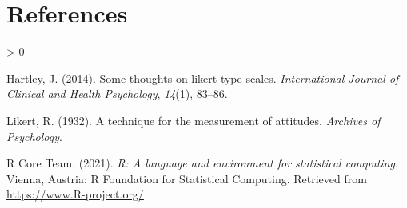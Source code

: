 \documentclass[
  english,
  man,floatsintext]{apa6}
\newlength{\cslhangindent}
\newenvironment{CSLReferences}[2] %
 {%
  \setlength{\parindent}{0pt}
  \ifodd #1 \everypar{\setlength{\hangindent}{\cslhangindent}}\ignorespaces\fi
  \ifnum #2 > 0
  \setlength{\parskip}{#2\baselineskip}
  \fi
 }%
 {}
\begin{document}
\hypertarget{references}{%
\section{References}\label{references}}

\begingroup
\setlength{\parindent}{-0.5in}
\setlength{\leftskip}{0.5in}

\hypertarget{refs}{}
\begin{CSLReferences}{1}{0}
\leavevmode\hypertarget{ref-hartley2014some}{}%
Hartley, J. (2014). Some thoughts on likert-type scales. \emph{International Journal of Clinical and Health Psychology}, \emph{14}(1), 83--86.

\leavevmode\hypertarget{ref-likert1932technique}{}%
Likert, R. (1932). A technique for the measurement of attitudes. \emph{Archives of Psychology}.

\leavevmode\hypertarget{ref-R-base}{}%
R Core Team. (2021). \emph{R: A language and environment for statistical computing}. Vienna, Austria: R Foundation for Statistical Computing. Retrieved from \url{https://www.R-project.org/}

\end{CSLReferences}

\endgroup
\end{document}
